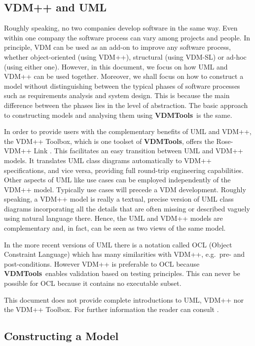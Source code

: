 \documentclass[\pformat,12pt,twoside]{article}
\newcommand{\vdmtools}{\textbf{VDMTools}}
\begin{document}
\subsection{VDM++ and UML}

Roughly speaking, no two companies develop software in the same 
way. Even within one company the software process can vary among 
projects and people. In principle, VDM can be used as an add-on 
to improve any software process, whether object-oriented (using 
VDM++), structural (using VDM-SL) or ad-hoc (using either one). 
However, in this document, we focus on how UML and VDM++ can 
be used together. Moreover, we shall focus on how to construct 
a model without distinguishing between the typical phases of 
software processes such as requirements analysis and system design. 
This is because the main difference between the phases lies in 
the level of abstraction. The basic approach to constructing 
models and analysing them using \vdmtools\ is the same.

In order to provide users with the complementary benefits of 
UML and VDM++, the VDM++ Toolbox, which is one toolset of \vdmtools, 
offers the Rose-VDM++ Link \cite{UMLMan-SCSK}. This facilitates an easy transition 
between UML and VDM++ models. It translates UML class diagrams 
automatically to VDM++ specifications, and vice versa, providing 
full round-trip engineering capabilities. Other aspects of UML 
like use cases can be employed independently of the VDM++ model. 
Typically use cases will precede a VDM development. Roughly speaking, 
a VDM++ model is really a textual, precise version of UML class 
diagrams incorporating all the details that are often missing 
or described vaguely using natural language there. Hence, the 
UML and VDM++ models are complementary and, in fact, can be seen 
as two views of the same model. 

In the more recent versions of UML there is a notation called OCL
(Object Constraint Language) which has many similarities with VDM++,
e.g.\ pre- and post-conditions. However VDM++ is preferable to OCL
because \vdmtools\ enables validation based on testing
principles. This can never be possible for OCL because it contains no
executable subset.

This document does not provide complete introductions to UML, 
VDM++ nor the VDM++ Toolbox. For further information the reader 
can consult \cite{Booch&99,LangManPP-SCSK,UserManPP-SCSK}.

\subsection{Constructing a Model}
\end{document}
